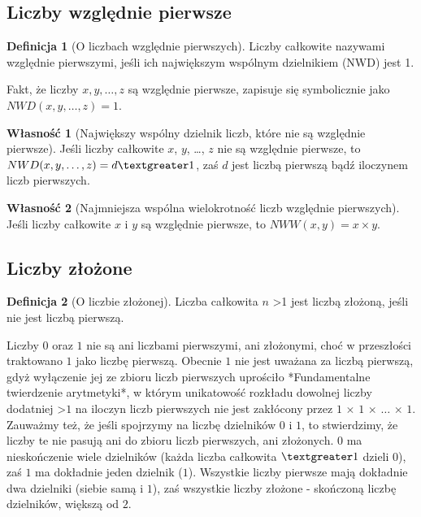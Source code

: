 \documentclass[10pt,onecolumn]{article}
\theoremstyle{definition}
\newtheorem{definition}{Definicja}
\theoremstyle{hypothesis}
\theoremstyle{capability}
\newtheorem{capability}{Własność}
\begin{document}
\subsection{Liczby względnie pierwsze}

\begin{definition}[O liczbach względnie pierwszych]
Liczby całkowite nazywami względnie pierwszymi, jeśli ich największym wspólnym dzielnikiem (NWD) jest 1.
\end{definition}

Fakt, że liczby $x, y, \dots , z$ są względnie pierwsze, zapisuje się symbolicznie jako $NWD (x, y,\dots ,z)=1$. 

\begin{capability}[Największy wspólny dzielnik liczb, które nie są względnie pierwsze]
Jeśli liczby całkowite $x$, $y$, \dots, $z$ nie są względnie pierwsze, to $NWD (x, y,\dots ,z) = d \textgreater 1$, zaś $d$ jest liczbą pierwszą bądź iloczynem liczb pierwszych.
\end{capability}

\begin{capability}[Najmniejsza wspólna wielokrotność liczb względnie pierwszych]
Jeśli liczby całkowite $x$ i $y$ są względnie pierwsze, to $NWW (x, y) = x \times y$.
\end{capability}

\subsection{Liczby złożone}

\begin{definition} [O liczbie złożonej]
Liczba całkowita $n$ \textgreater 1 jest liczbą złożoną, jeśli nie jest liczbą pierwszą.
\end{definition}

Liczby $0$ oraz $1$ nie są ani liczbami pierwszymi, ani złożonymi, choć w przeszłości traktowano $1$ jako liczbę pierwszą. Obecnie $1$ nie jest uważana za liczbą pierwszą, gdyż wyłączenie jej ze zbioru liczb pierwszych uprościło *Fundamentalne twierdzenie arytmetyki*, w którym unikatowość rozkładu dowolnej liczby dodatniej \textgreater $1$ na iloczyn liczb pierwszych nie jest zakłócony przez $1$ $\times$ $1$ $\times$ $\ldots$ $\times$ $1$. Zauważmy też, że jeśli spojrzymy na liczbę dzielników $0$ i $1$, to stwierdzimy, że liczby te nie pasują ani do zbioru liczb pierwszych, ani złożonych. $0$ ma nieskończenie wiele dzielników (każda liczba całkowita $\textgreater 1$ dzieli $0$), zaś $1$ ma dokładnie jeden dzielnik ($1$). Wszystkie liczby pierwsze mają dokładnie dwa dzielniki (siebie samą i $1$), zaś wszystkie liczby złożone - skończoną liczbę dzielników, większą od $2$.
\end{document}
